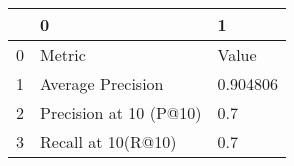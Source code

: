 \begin{tabular}{lll}
\toprule
{} &                       0 &         1 \\
\midrule
0 &                  Metric &     Value \\
1 &       Average Precision &  0.904806 \\
2 &  Precision at 10 (P@10) &       0.7 \\
3 &      Recall at 10(R@10) &       0.7 \\
\bottomrule
\end{tabular}
